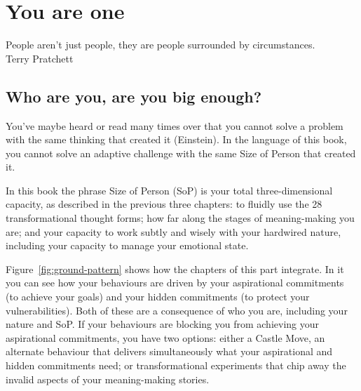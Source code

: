 ﻿%
\chapter{You are one}
\label{chapter:who-am-i-one}


\begin{chapterquotation}
People aren't just people, they are people surrounded by circumstances.\\
\raggedleft\textemdash Terry Pratchett 
\end{chapterquotation}


\section{Who are you, are you big enough?}
\label{section:size-of-person}
You’ve maybe heard or read many times over that you cannot solve a problem with the same thinking that created it (Einstein).  In the language of this book, you cannot solve an adaptive challenge with the same Size of Person  that created it.


In this book the phrase Size of Person (SoP) is your total three-dimensional capacity, as described in the previous three chapters: to fluidly use the 28 transformational thought forms; how far along the stages of meaning\hyp{}making you are; and your capacity to work subtly and wisely with your hardwired nature, including your capacity to manage your emotional state.


Figure~\ref{fig:ground-pattern} shows how the chapters of this part integrate. In it you can see how your behaviours are driven by your aspirational commitments (to achieve your goals) and your hidden commitments (to protect your vulnerabilities). Both of these are a consequence of who you are, including your nature and SoP. If your behaviours are blocking you from achieving your aspirational commitments, you have two options: either a Castle Move, an alternate behaviour that delivers simultaneously what your aspirational and hidden commitments need; or transformational experiments that chip away the invalid aspects of your meaning\hyp{}making stories.


